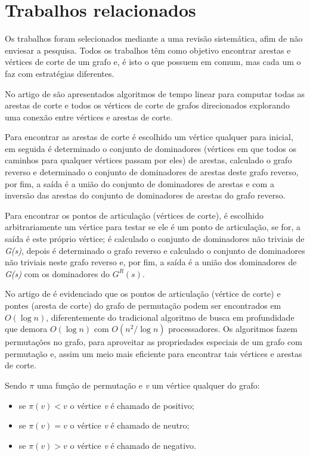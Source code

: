\documentclass[
	article,
	12pt,
	openright,
	oneside,
	a4paper,
	english,
	french,
	spanish,
	brazil
	]{abntex2}
\begin{document}
\section{Trabalhos relacionados}
Os trabalhos foram selecionados mediante a uma revisão sistemática, afim de não enviesar a pesquisa. Todos os trabalhos têm como objetivo encontrar arestas e vértices de corte de um grafo e, é isto o que possuem em comum, mas cada um o faz com estratégias diferentes.

No artigo de \cite{italiano2012} são apresentados algoritmos de tempo linear para computar todas as arestas de corte e todos os vértices de corte de grafos direcionados explorando uma conexão entre vértices e arestas de corte.

Para encontrar as arestas de corte é escolhido um vértice qualquer para inicial, em seguida é determinado o conjunto de dominadores (vértices em que todos os caminhos para qualquer vértices passam por eles) de arestas, calculado o grafo reverso e determinado o conjunto de dominadores de arestas deste grafo reverso, por fim, a saída é a união do conjunto de dominadores de arestas e com a inversão das arestas do conjunto de dominadores de arestas do grafo reverso.

Para encontrar os pontos de articulação (vértices de corte), é escolhido arbitrariamente um vértice para testar se ele é um ponto de articulação, se for, a saída é este próprio vértice; é calculado o conjunto de dominadores não triviais de \textit{G(s)}, depois é determinado o grafo reverso e calculado o conjunto de dominadores não triviais neste grafo reverso e, por fim, a saída é a união dos dominadores de \textit{G(s)}  com os dominadores do $G^R(s)$.

No artigo de \cite{ibarra1993} é evidenciado que os pontos de articulação (vértice de corte) e pontes (aresta de corte) do grafo de permutação podem ser encontrados em $O (\log n)$, diferentemente do tradicional algoritmo de busca em profundidade que demora $O (\log n)$ com $O (n^2/\log n)$ processadores. Os algoritmos fazem permutações no grafo, para aproveitar as propriedades especiais de um grafo com permutação e, assim um meio mais eficiente para encontrar tais vértices e arestas de corte.

Sendo $\pi$ uma função de permutação e \textit{v} um vértice qualquer do grafo:
\begin{itemize}
\item se $\pi(v) < v$ o vértice \textit{v} é chamado de positivo;
\item se $\pi(v) = v$ o vértice \textit{v} é chamado de neutro;
\item se $\pi(v) > v$ o vértice \textit{v} é chamado de negativo.
\end{itemize}
\end{document}

